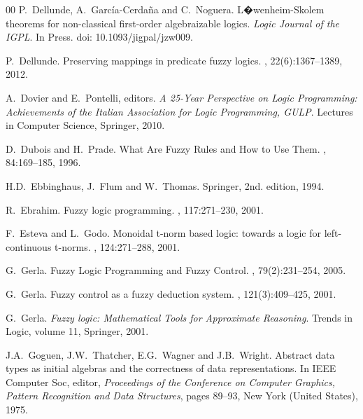 \documentclass{IOS-Book-Article}
\begin{document}
{\begin{thebibliography}{00}
P.~Dellunde, A.~Garc\'ia-Cerda\~{n}a and C.~Noguera. 
\newblock L{�}wenheim-Skolem theorems for non-classical first-order algebraizable logics.
\newblock \emph{Logic Journal of the IGPL}. In Press. doi: 10.1093/jigpal/jzw009.  


P.~Dellunde.
\newblock Preserving mappings in predicate fuzzy logics.
, 22(6):1367--1389, 2012. 









A.~Dovier and E.~Pontelli, editors. 
\newblock \emph{A 25-Year Perspective on Logic Programming: Achievements of the Italian Association for Logic Programming, GULP}.
\newblock Lectures in Computer Science, Springer, 2010.

D.~Dubois and H.~Prade.
\newblock What Are Fuzzy Rules and How to Use Them.
, 84:169--185, 1996.




H.D.~Ebbinghaus, J.~Flum and W.~Thomas.
\newblock Springer, 2nd. edition,
  1994.
  
  
  
R.~Ebrahim.
\newblock Fuzzy logic programming.
, 117:271--230, 2001.


F.~Esteva and L.~Godo.
\newblock Monoidal t-norm based logic: towards a logic for left-continuous t-norms.
, 124:271--288, 2001.

  G.~Gerla. 
\newblock Fuzzy Logic Programming and Fuzzy Control.
, 79(2):231--254, 2005.

  G.~Gerla. 
\newblock Fuzzy control as a fuzzy deduction system.
, 121(3):409--425, 2001.


G.~Gerla. 
\newblock \emph{Fuzzy logic: Mathematical Tools for Approximate Reasoning}. Trends in Logic, 
\newblock volume 11, Springer, 2001.



  J.A.~Goguen,   J.W.~Thatcher,   E.G.~Wagner and   J.B.~Wright. 
\newblock  Abstract data types as initial algebras and the correctness of data representations. In IEEE Computer Soc, editor, {\em Proceedings of the Conference on Computer
Graphics, Pattern Recognition and Data Structures}, pages 89--93, New York (United States), 1975.



\end{thebibliography}}
\end{document}
